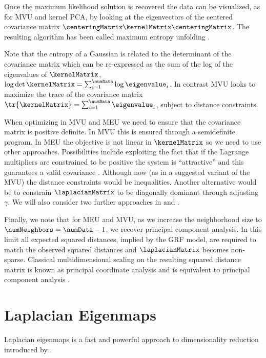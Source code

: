 Once the maximum likelihood solution is recovered the data can be
visualized, as for MVU and kernel PCA, by looking at the eigenvectors
of the centered covariance matrix
$\centeringMatrix\kernelMatrix\centeringMatrix$. The resulting
algorithm has been called maximum entropy unfolding
\citep[MEU][]{Lawrence:unifying10}.

Note that the entropy of a Gaussian is related to the
determinant of the covariance matrix which can be re-expressed as the
sum of the log of the eigenvalues of $\kernelMatrix$, $\log
\det{\kernelMatrix}=\sum_{i=1}^\numData \log \eigenvalue_i$. In
contrast MVU looks to maximize the trace of the covariance matrix
$\tr{\kernelMatrix}=\sum_{i=1}^\numData \eigenvalue_i$, subject to
distance constraints.

When optimizing in MVU and MEU we need to ensure that the covariance
matrix is positive definite. In MVU this is ensured through a
semidefinite program. In MEU the objective is not linear in
$\kernelMatrix$ so we need to use other approaches. Possibilities
include exploiting the fact that if the Lagrange multipliers are constrained to
be positive the system is ``attractive'' and this guarantees a valid
covariance \citep[see e.g.][pg 255]{Koller:book09}. Although now (as
in a suggested variant of the MVU) the distance constraints would be
inequalities. Another alternative would be to constrain
$\laplacianMatrix$ to be diagonally dominant through adjusting
$\gamma$. We will also consider two further approaches in
 and .

Finally, we note that for MEU and MVU, as we increase the neighborhood
size to $\numNeighbors = \numData-1$, we recover principal component
analysis. In this limit all expected squared distances, implied by the
GRF model, are required to match the observed
squared distances and $\laplacianMatrix$ becomes non-sparse. Classical
multidimensional scaling on the resulting squared distance matrix is
known as principal coordinate analysis and is equivalent to principal
component analysis \citep[see][]{Mardia:multivariate79}. 

\section{Laplacian Eigenmaps}

Laplacian eigenmaps is a fast and powerful approach to dimensionality
reduction introduced by \citep{Belkin:laplacian03}.


